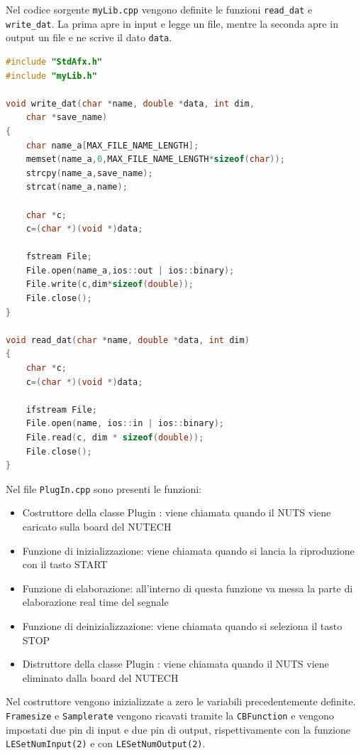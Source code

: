 \documentclass[12pt,a4paper,titlepage]{article}
\begin{document}
Nel codice sorgente \texttt{myLib.cpp} vengono definite le funzioni \texttt{read\_dat} e \texttt{write\_dat}. La prima apre in input e legge un file, mentre la seconda apre in output un file e ne scrive il dato \texttt{data}.

\begin{lstlisting}[language=cpp, label=code:myLib.cpp, caption = File \texttt{myLib.cpp}, breaklines = false, breaklines = false, captionpos = b]
#include "StdAfx.h"
#include "myLib.h"

void write_dat(char *name, double *data, int dim, 
	char *save_name) 
{
	char name_a[MAX_FILE_NAME_LENGTH];
	memset(name_a,0,MAX_FILE_NAME_LENGTH*sizeof(char));
	strcpy(name_a,save_name);
	strcat(name_a,name);

	char *c;
	c=(char *)(void *)data;

	fstream File;
	File.open(name_a,ios::out | ios::binary);
	File.write(c,dim*sizeof(double));
	File.close();
}

void read_dat(char *name, double *data, int dim) 
{
	char *c;
	c=(char *)(void *)data;

	ifstream File;
	File.open(name, ios::in | ios::binary);
	File.read(c, dim * sizeof(double));
	File.close();
}
\end{lstlisting}
Nel file \texttt{PlugIn.cpp} sono presenti le funzioni:
\begin{itemize}
\item Costruttore della classe Plugin : viene chiamata quando il NUTS viene caricato sulla board del NUTECH
\item Funzione di inizializzazione: viene chiamata quando si lancia la riproduzione con il tasto START
\item Funzione di elaborazione: all’interno di questa funzione va messa la parte di elaborazione real time del segnale
\item Funzione di deinizializzazione: viene chiamata quando si seleziona il tasto STOP
\item Distruttore della classe
Plugin : viene chiamata quando il NUTS viene eliminato dalla board del NUTECH
\end{itemize}
Nel costruttore vengono inizializzate a zero le variabili precedentemente definite.
\texttt{Framesize} e \texttt{Samplerate} vengono ricavati tramite la \texttt{CBFunction} e vengono impostati due pin di input e due pin di output, rispettivamente con la funzione \texttt{LESetNumInput(2)} e con \texttt{LESetNumOutput(2)}.
\end{document}
